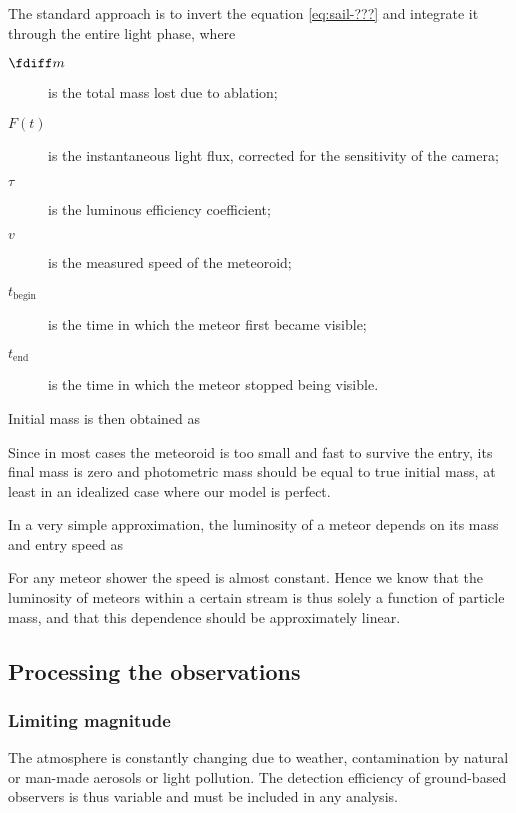             The standard approach is to invert the equation \cref{eq:sail-???} and integrate it
            through the entire light phase,
            where
            \begin{description}
                \item[$\fdiff m$]
                    is the total mass lost due to ablation;
                \item[$F(t)$]
                    is the instantaneous light flux, corrected for the sensitivity of the camera;
                \item[$\tau$]
                    is the luminous efficiency coefficient;
                \item[$v$]
                    is the measured speed of the meteoroid;
                \item[$t_\mathrm{begin}$]
                    is the time in which the meteor first became visible;
                \item[$t_\mathrm{end}$]
                    is the time in which the meteor stopped being visible.
            \end{description}

            Initial mass is then obtained as

            Since in most cases the meteoroid is too small and fast to survive the entry, its final mass is zero
            and photometric mass should be equal to true initial mass, at least in an idealized case where our model is perfect.


            In a very simple approximation, the luminosity of a meteor depends on its mass and entry speed as

            For any meteor shower the speed is almost constant. Hence we know that the luminosity of meteors
            within a certain stream is thus solely a function of particle mass, and that this dependence should
            be approximately linear.

    \subsection{Processing the observations} \label{msp}
        \subsubsection{Limiting magnitude} \label{mspm}
            The atmosphere is constantly changing due to weather, contamination
            by natural or man-made aerosols or light pollution. The detection efficiency
            of ground-based observers is thus variable and must be included in any analysis.

